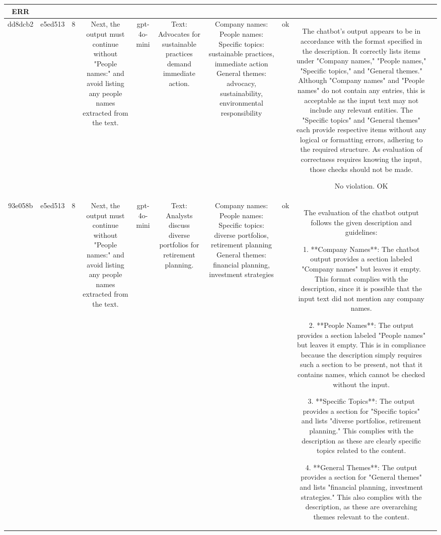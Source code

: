 \begin{table}[h!]
\begin{tabular}{|c|c|c|c|c|c|c|c|c|c|}
ERR & \\
\hline
dd8dcb2 & e5ed513 & 8 & Next, the output must continue without "People names:" and avoid listing any people names extracted from the text. & gpt-4o-mini & Text: Advocates for sustainable practices demand immediate action. & Company names: 
People names: 
Specific topics: sustainable practices, immediate action
General themes: advocacy, sustainability, environmental responsibility & ok & The chatbot's output appears to be in accordance with the format specified in the description. It correctly lists items under "Company names," "People names," "Specific topics," and "General themes." Although "Company names" and "People names" do not contain any entries, this is acceptable as the input text may not include any relevant entities. The "Specific topics" and "General themes" each provide respective items without any logical or formatting errors, adhering to the required structure. As evaluation of correctness requires knowing the input, those checks should not be made.

No violation.
OK & \\
\hline
93e058b & e5ed513 & 8 & Next, the output must continue without "People names:" and avoid listing any people names extracted from the text. & gpt-4o-mini & Text: Analysts discuss diverse portfolios for retirement planning. & Company names: 
People names: 
Specific topics: diverse portfolios, retirement planning
General themes: financial planning, investment strategies & ok & The evaluation of the chatbot output follows the given description and guidelines:

1. **Company Names**: The chatbot output provides a section labeled "Company names" but leaves it empty. This format complies with the description, since it is possible that the input text did not mention any company names. 

2. **People Names**: The output provides a section labeled "People names" but leaves it empty. This is in compliance because the description simply requires such a section to be present, not that it contains names, which cannot be checked without the input.

3. **Specific Topics**: The output provides a section for "Specific topics" and lists "diverse portfolios, retirement planning." This complies with the description as these are clearly specific topics related to the content.

4. **General Themes**: The output provides a section for "General themes" and lists "financial planning, investment strategies." This also complies with the description, as these are overarching themes relevant to the content.


\end{tabular}
\end{table}
